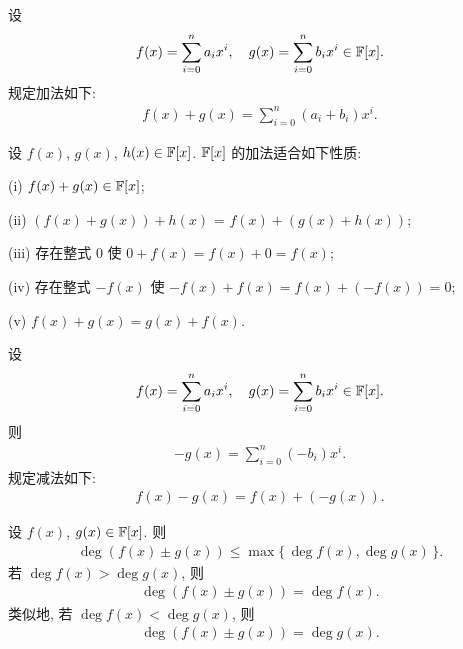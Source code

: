 \begin{definition}
    设
    \begin{align*}
        f(x) = \sum_{i=0}^n a_i x^i, \quad g(x) = \sum_{i=0}^n b_i x^i \in \mathbb{F}[x].
    \end{align*}
    规定加法如下:
    \begin{align*}
        f(x) + g(x) = \sum_{i=0}^n (a_i + b_i) x^i.
    \end{align*}
\end{definition}

\begin{proposition}
    设 $f(x)$, $g(x)$, $h(x) \in \mathbb{F}[x]$. $\mathbb{F}[x]$ 的加法适合如下性质:

    (i) $f(x) + g(x) \in \mathbb{F}[x]$;

    (ii) $(f(x) + g(x)) + h(x)$ = $f(x) + (g(x) + h(x))$;

    (iii) 存在整式 $0$ 使 $0 + f(x) = f(x) + 0 = f(x)$;

    (iv) 存在整式 $-f(x)$ 使 $-f(x) + f(x) = f(x) + (-f(x)) = 0$;

    (v) $f(x) + g(x) = g(x) + f(x)$.
\end{proposition}

\begin{definition}
    设
    \begin{align*}
        f(x) = \sum_{i=0}^n a_i x^i, \quad g(x) = \sum_{i=0}^n b_i x^i \in \mathbb{F}[x].
    \end{align*}
    则
    \begin{align*}
        -g(x) = \sum_{i=0}^n (-b_i) x^i.
    \end{align*}
    规定减法如下:
    \begin{align*}
        f(x) - g(x) = f(x) + (-g(x)).
    \end{align*}
\end{definition}

\begin{proposition}
    设 $f(x)$, $g(x) \in \mathbb{F}[x]$. 则
    \begin{align*}
        \deg {(f(x) \pm g(x))} \leq \max \{\, \deg f(x), \deg g(x) \,\}.
    \end{align*}
    若 $\deg f(x) > \deg g(x)$, 则
    \begin{align*}
        \deg {(f(x) \pm g(x))} = \deg f(x).
    \end{align*}
    类似地, 若 $\deg f(x) < \deg g(x)$, 则
    \begin{align*}
        \deg {(f(x) \pm g(x))} = \deg g(x).
    \end{align*}
\end{proposition}

